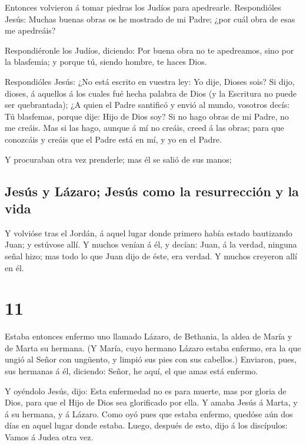  Entonces volvieron á tomar piedras los Judíos para
apedrearle.  Respondióles Jesús: Muchas buenas obras os he
mostrado de mi Padre; ¿por cuál obra de esas me apedreáis?

 Respondiéronle los Judíos, diciendo: Por buena obra no te
apedreamos, sino por la blasfemia; y porque tú, siendo hombre, te haces
Dios.

 Respondióles Jesús: ¿No está escrito en vuestra ley: Yo
dije, Dioses sois?  Si dijo, dioses, á aquellos á los
cuales fué hecha palabra de Dios (y la Escritura no puede ser
quebrantada);  ¿A quien el Padre santificó y envió al
mundo, vosotros decís: Tú blasfemas, porque dije: Hijo de Dios soy?
 Si no hago obras de mi Padre, no me creáis. 
Mas si las hago, aunque á mí no creáis, creed á las obras; para que
conozcáis y creáis que el Padre está en mí, y yo en el Padre.

 Y procuraban otra vez prenderle; mas él se salió de sus
manos;

\hypertarget{jesuxfas-y-luxe1zaro-jesuxfas-como-la-resurrecciuxf3n-y-la-vida}{%
\subsection{Jesús y Lázaro; Jesús como la resurrección y la
vida}\label{jesuxfas-y-luxe1zaro-jesuxfas-como-la-resurrecciuxf3n-y-la-vida}}

 Y volvióse tras el Jordán, á aquel lugar donde primero
había estado bautizando Juan; y estúvose allí.  Y muchos
venían á él, y decían: Juan, á la verdad, ninguna señal hizo; mas todo
lo que Juan dijo de éste, era verdad.  Y muchos creyeron
allí en él.

\hypertarget{section-10}{%
\section{11}\label{section-10}}

 Estaba entonces enfermo uno llamado Lázaro, de Bethania, la
aldea de María y de Marta su hermana.  (Y María, cuyo
hermano Lázaro estaba enfermo, era la que ungió al Señor con ungüento, y
limpió sus pies con sus cabellos.)  Enviaron, pues, sus
hermanas á él, diciendo: Señor, he aquí, el que amas está enfermo.

 Y oyéndolo Jesús, dijo: Esta enfermedad no es para muerte,
mas por gloria de Dios, para que el Hijo de Dios sea glorificado por
ella.  Y amaba Jesús á Marta, y á su hermana, y á Lázaro.
 Como oyó pues que estaba enfermo, quedóse aún dos días en
aquel lugar donde estaba.  Luego, después de esto, dijo á
los discípulos: Vamos á Judea otra vez.

